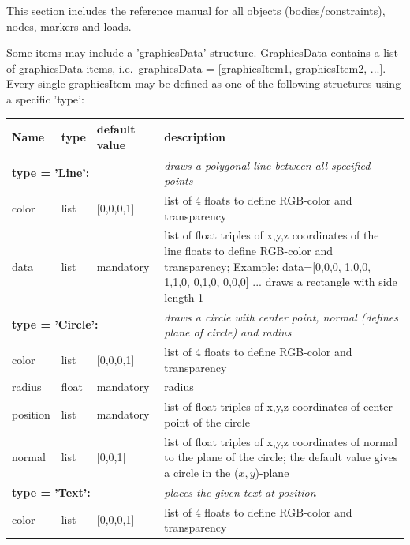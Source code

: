 \documentclass[11pt,a4paper]{book} %
\begin{document}



 \label{sec_item_reference_manual}
This section includes the reference manual for all objects (bodies/constraints), nodes, markers and loads.



Some items may include a 'graphicsData' structure. GraphicsData contains a list of graphicsData items, i.e.\ graphicsData = [graphicsItem1, graphicsItem2, ...]. Every single graphicsItem may be defined as one of the following structures using a specific 'type':
\begin{center}
  \footnotesize
  \begin{longtable}{| p{3cm} | p{2cm} | p{3cm} | p{7.5cm} |} 
	\hline
  \bf Name & \bf type & \bf default value & \bf description \\ \hline
%
	\multicolumn{3}{l}{\parbox{8cm}{\bf type = 'Line': }} & \multicolumn{1}{l}{\parbox{7.5cm}{\it draws a polygonal line between all specified points}}\\ \hline
  color & list & [0,0,0,1] & list of 4 floats to define RGB-color and transparency\\ \hline
  data & list &  mandatory & list of float triples of x,y,z coordinates of the line floats to define RGB-color and transparency; Example: data=[0,0,0, 1,0,0, 1,1,0, 0,1,0, 0,0,0] ... draws a rectangle with side length 1\\ \hline
%
	\multicolumn{3}{l}{\parbox{8cm}{\bf type = 'Circle': }} & \multicolumn{1}{l}{\parbox{7.5cm}{\it draws a circle with center point, normal (defines plane of circle) and radius}}\\ \hline
  color & list & [0,0,0,1] & list of 4 floats to define RGB-color and transparency\\ \hline
  radius & float & mandatory & radius\\ \hline
  position & list & mandatory & list of float triples of x,y,z coordinates of center point of the circle\\ \hline
  normal & list & [0,0,1] & list of float triples of x,y,z coordinates of normal to the plane of the circle; the default value gives a circle in the ($x,y$)-plane\\ \hline
	\multicolumn{3}{l}{\parbox{8cm}{\bf type = 'Text': }} & \multicolumn{1}{l}{\parbox{7.5cm}{\it places the given text at position}}\\ \hline
  color & list & [0,0,0,1] & list of 4 floats to define RGB-color and transparency\\ \hline

\end{longtable}
\end{center}
\end{document}
